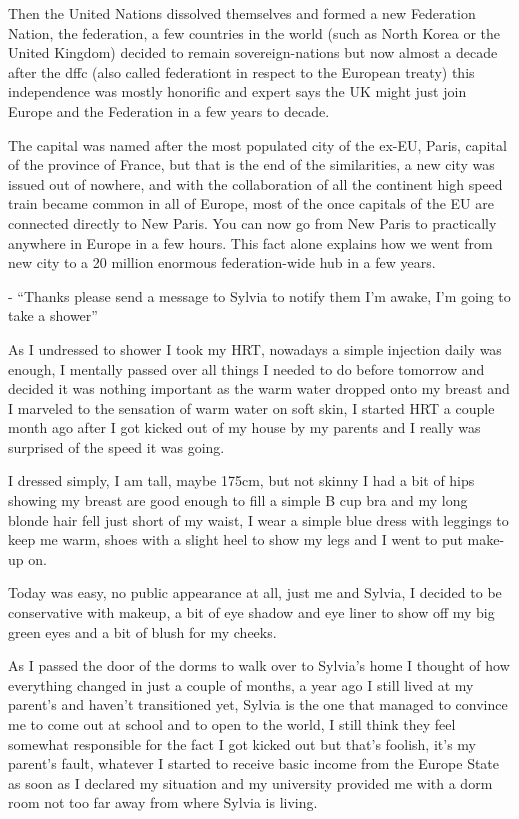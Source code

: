 \documentclass[hidelinks,12pt,a4paper]{book}
\begin{document}
Then the United Nations dissolved themselves and formed a new Federation Nation, 
the \gls{federation}, a few countries in the world (such as North Korea or the United Kingdom) 
decided to remain sovereign-nations but now almost a decade after the \gls{dffc} (also called \gls{federationt} in respect to the European treaty) this independence was mostly honorific 
and expert says the UK might just join Europe and the Federation in a few years to decade.\par
\bigskip

The capital was named after the most populated city of the ex-EU, 
Paris, capital of the province of France, but that is the end of the similarities, 
a new city was issued out of nowhere, and with the collaboration of all the continent 
high speed train became common in all of Europe, most of the once capitals of the EU are connected directly to New Paris. 
You can now go from New Paris to practically anywhere in Europe in a few hours. 
This fact alone explains how we went from new city to a 20 million enormous federation-wide hub in a few years.\par
\bigskip

- “Thanks please send a message to Sylvia to notify them I'm awake, I'm going to take a shower”\par
\bigskip
As I undressed to shower I took my HRT, nowadays a simple injection daily was enough, 
I mentally passed over all things I needed to do before tomorrow and decided it was nothing 
important as the warm water dropped onto my breast and I marveled to the sensation of warm water on soft skin, 
I started HRT a couple month ago after I got kicked out of my house by my parents and 
I really was surprised of the speed it was going.\par
\bigskip

I dressed simply, I am tall, maybe 175cm, 
but not skinny I had a bit of hips showing my breast are good enough to fill a simple B cup bra and 
my long blonde hair fell just short of my waist, I wear a simple blue dress with leggings to keep me warm, 
shoes with a slight heel to show my legs and I went to put make-up on.\par
\bigskip

Today was easy, no public appearance at all, just me and Sylvia, I decided to be conservative with makeup, 
a bit of eye shadow and eye liner to show off my big green eyes and a bit of blush for my cheeks.\par
\bigskip

As I passed the door of the dorms to walk over to Sylvia's home 
I thought of how everything changed in just a couple of months, a year ago I still lived at my parent's 
and haven't transitioned yet, Sylvia is the one that managed to convince me to come out at school and to open to the world, 
I still think they feel somewhat responsible for the fact I got kicked out but that's foolish, it's my parent's fault, 
whatever I started to receive basic income from the Europe State as soon as I declared my situation and my 
university provided me with a dorm room not too far away from where Sylvia is living.\par
\bigskip
\end{document}

